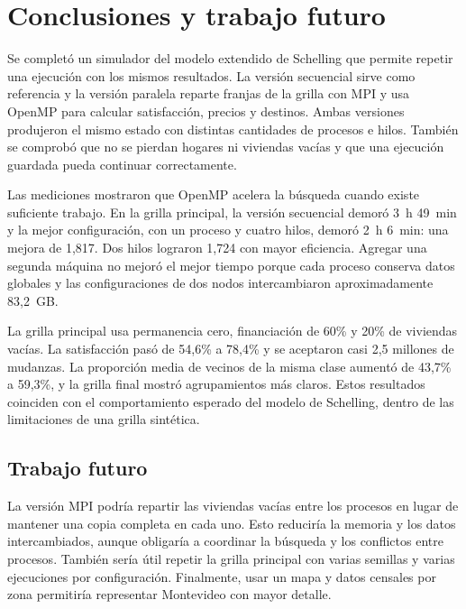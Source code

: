 \section{Conclusiones y trabajo futuro}

Se completó un simulador del modelo extendido de Schelling que permite repetir una ejecución con los mismos resultados. La versión secuencial sirve como referencia y la versión paralela reparte franjas de la grilla con MPI y usa OpenMP para calcular satisfacción, precios y destinos. Ambas versiones produjeron el mismo estado con distintas cantidades de procesos e hilos. También se comprobó que no se pierdan hogares ni viviendas vacías y que una ejecución guardada pueda continuar correctamente.

Las mediciones mostraron que OpenMP acelera la búsqueda cuando existe suficiente trabajo. En la grilla principal, la versión secuencial demoró 3~h 49~min y la mejor configuración, con un proceso y cuatro hilos, demoró 2~h 6~min: una mejora de 1,817. Dos hilos lograron 1,724 con mayor eficiencia. Agregar una segunda máquina no mejoró el mejor tiempo porque cada proceso conserva datos globales y las configuraciones de dos nodos intercambiaron aproximadamente 83,2~GB.

La grilla principal usa permanencia cero, financiación de 60\% y 20\% de viviendas vacías. La satisfacción pasó de 54,6\% a 78,4\% y se aceptaron casi 2,5 millones de mudanzas. La proporción media de vecinos de la misma clase aumentó de 43,7\% a 59,3\%, y la grilla final mostró agrupamientos más claros. Estos resultados coinciden con el comportamiento esperado del modelo de Schelling, dentro de las limitaciones de una grilla sintética.

\subsection{Trabajo futuro}

La versión MPI podría repartir las viviendas vacías entre los procesos en lugar de mantener una copia completa en cada uno. Esto reduciría la memoria y los datos intercambiados, aunque obligaría a coordinar la búsqueda y los conflictos entre procesos. También sería útil repetir la grilla principal con varias semillas y varias ejecuciones por configuración. Finalmente, usar un mapa y datos censales por zona permitiría representar Montevideo con mayor detalle.
